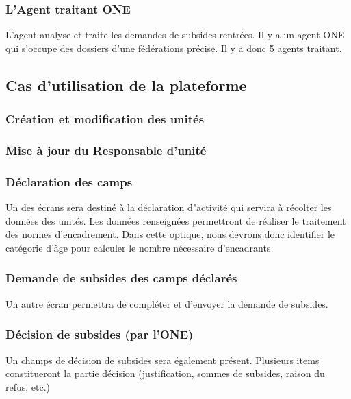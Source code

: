 
\subsubsection{L'Agent traitant ONE}

L'agent analyse et traite les demandes de subsides rentrées. Il y a un agent ONE qui s'occupe des dossiers d'une fédérations précise. Il y a donc 5 agents traitant. 

\subsection{Cas d'utilisation de la plateforme}

\subsubsection{Création et modification des unités}



\subsubsection{Mise à jour du Responsable d'unité}

\subsubsection{Déclaration des camps}
Un des écrans sera destiné à la déclaration d"activité qui servira à récolter les données des unités. Les données renseignées permettront de réaliser le traitement des normes d'encadrement. Dans cette optique, nous devrons donc identifier le catégorie d'âge pour calculer le nombre nécessaire d'encadrants

\subsubsection{Demande de subsides des camps déclarés}
Un autre écran permettra de compléter et d'envoyer la demande de subsides.


\subsubsection{Décision de subsides (par l'ONE)}
Un champs de décision de subsides sera également présent. Plusieurs items constitueront la partie décision (justification, sommes de subsides, raison du refus, etc.)






